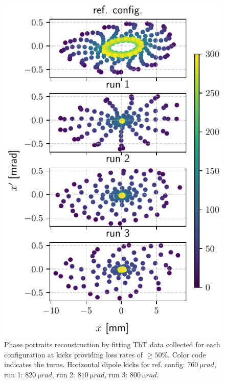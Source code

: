 \documentclass[a4paper,
               keeplastbox,   %
               ]{jacow}
\begin{document}
\begin{figure}[!h]
    \centering
    \includegraphics[width=\columnwidth]{old_tunes_phase.pdf}
    \caption{Phase portraits reconstruction by fitting TbT data collected for each configuration at kicks providing loss rates of $\geq 50\%$. Color code indicates the turns. Horizontal dipole kicks for ref. config: $760~\unit{\micro rad}$, run 1: $820~\unit{\micro rad}$, run 2: $810~\unit{\micro rad}$, run 3: $800~\unit{\micro rad}$.}
    \label{fig:oldtunes_phase}
\end{figure}
\end{document}
